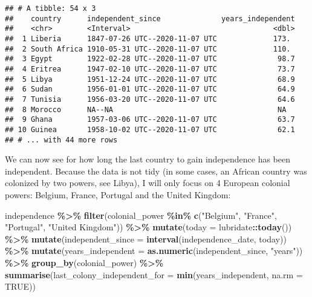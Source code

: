 \documentclass[
]{article}
\newenvironment{Shaded}{\begin{snugshade}}{\end{snugshade}}
\newcommand{\DataTypeTok}[1]{\textcolor[rgb]{0.13,0.29,0.53}{#1}}
\newcommand{\KeywordTok}[1]{\textcolor[rgb]{0.13,0.29,0.53}{\textbf{#1}}}
\newcommand{\NormalTok}[1]{#1}
\newcommand{\OperatorTok}[1]{\textcolor[rgb]{0.81,0.36,0.00}{\textbf{#1}}}
\newcommand{\OtherTok}[1]{\textcolor[rgb]{0.56,0.35,0.01}{#1}}
\newcommand{\StringTok}[1]{\textcolor[rgb]{0.31,0.60,0.02}{#1}}
\begin{document}
\begin{verbatim}
## # A tibble: 54 x 3
##    country      independent_since              years_independent
##    <chr>        <Interval>                                 <dbl>
##  1 Liberia      1847-07-26 UTC--2020-11-07 UTC             173. 
##  2 South Africa 1910-05-31 UTC--2020-11-07 UTC             110. 
##  3 Egypt        1922-02-28 UTC--2020-11-07 UTC              98.7
##  4 Eritrea      1947-02-10 UTC--2020-11-07 UTC              73.7
##  5 Libya        1951-12-24 UTC--2020-11-07 UTC              68.9
##  6 Sudan        1956-01-01 UTC--2020-11-07 UTC              64.9
##  7 Tunisia      1956-03-20 UTC--2020-11-07 UTC              64.6
##  8 Morocco      NA--NA                                      NA  
##  9 Ghana        1957-03-06 UTC--2020-11-07 UTC              63.7
## 10 Guinea       1958-10-02 UTC--2020-11-07 UTC              62.1
## # ... with 44 more rows
\end{verbatim}

We can now see for how long the last country to gain independence has been independent.
Because the data is not tidy (in some cases, an African country was colonized by two powers,
see Libya), I will only focus on 4 European colonial powers: Belgium, France, Portugal and the United Kingdom:

\begin{Shaded}
\begin{Highlighting}[]
\NormalTok{independence }\OperatorTok{\%\textgreater{}\%}
\StringTok{  }\KeywordTok{filter}\NormalTok{(colonial\_power }\OperatorTok{\%in\%}\StringTok{ }\KeywordTok{c}\NormalTok{(}\StringTok{"Belgium"}\NormalTok{, }\StringTok{"France"}\NormalTok{, }\StringTok{"Portugal"}\NormalTok{, }\StringTok{"United Kingdom"}\NormalTok{)) }\OperatorTok{\%\textgreater{}\%}
\StringTok{  }\KeywordTok{mutate}\NormalTok{(}\DataTypeTok{today =}\NormalTok{ lubridate}\OperatorTok{::}\KeywordTok{today}\NormalTok{()) }\OperatorTok{\%\textgreater{}\%}
\StringTok{  }\KeywordTok{mutate}\NormalTok{(}\DataTypeTok{independent\_since =} \KeywordTok{interval}\NormalTok{(independence\_date, today)) }\OperatorTok{\%\textgreater{}\%}
\StringTok{  }\KeywordTok{mutate}\NormalTok{(}\DataTypeTok{years\_independent =} \KeywordTok{as.numeric}\NormalTok{(independent\_since, }\StringTok{"years"}\NormalTok{)) }\OperatorTok{\%\textgreater{}\%}
\StringTok{  }\KeywordTok{group\_by}\NormalTok{(colonial\_power) }\OperatorTok{\%\textgreater{}\%}
\StringTok{  }\KeywordTok{summarise}\NormalTok{(}\DataTypeTok{last\_colony\_independent\_for =} \KeywordTok{min}\NormalTok{(years\_independent, }\DataTypeTok{na.rm =} \OtherTok{TRUE}\NormalTok{))}
\end{Highlighting}
\end{Shaded}
\end{document}
